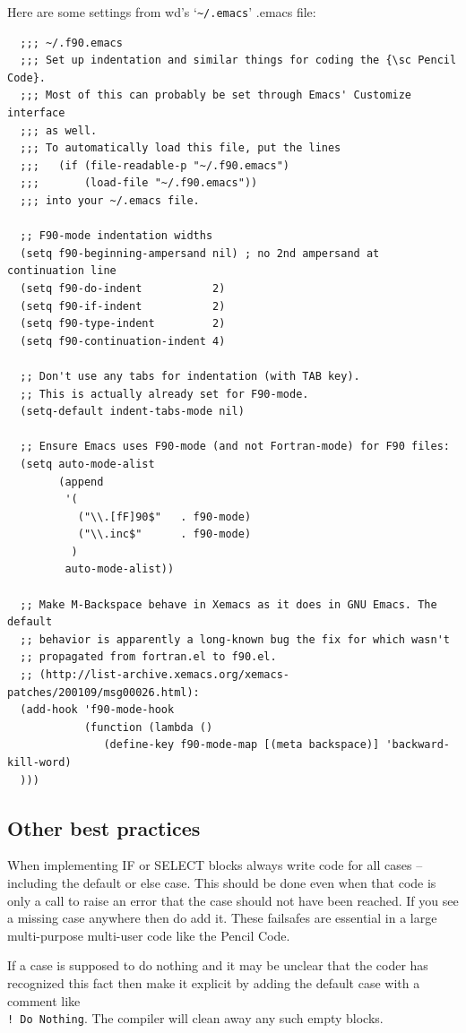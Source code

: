 \documentclass[\mydriver,12pt,twoside,notitlepage,a4paper]{article}
\makeatletter
\newcommand{\code}[1]{\texttt{#1}}
\newcommand{\file}[2][]{%
  \def\index@{#1}%
  `\texttt{#2}'%
  \ifx\index@\@empty\index[file]{#2@\texttt{#2}}%
  \else\index[file]{#1@\texttt{#1}}%
  \fi%
}
\makeatother
\begin{document}
Here are some settings from wd's \file[.emacs]{\~{}/.emacs} file:
\begin{Verbatim}
  ;;; ~/.f90.emacs
  ;;; Set up indentation and similar things for coding the {\sc Pencil Code}.
  ;;; Most of this can probably be set through Emacs' Customize interface
  ;;; as well.
  ;;; To automatically load this file, put the lines
  ;;;   (if (file-readable-p "~/.f90.emacs")
  ;;;       (load-file "~/.f90.emacs"))
  ;;; into your ~/.emacs file.

  ;; F90-mode indentation widths
  (setq f90-beginning-ampersand nil) ; no 2nd ampersand at continuation line
  (setq f90-do-indent           2)
  (setq f90-if-indent           2)
  (setq f90-type-indent         2)
  (setq f90-continuation-indent 4)

  ;; Don't use any tabs for indentation (with TAB key).
  ;; This is actually already set for F90-mode.
  (setq-default indent-tabs-mode nil)

  ;; Ensure Emacs uses F90-mode (and not Fortran-mode) for F90 files:
  (setq auto-mode-alist
        (append
         '(
           ("\\.[fF]90$"   . f90-mode)
           ("\\.inc$"      . f90-mode)
          )
         auto-mode-alist))

  ;; Make M-Backspace behave in Xemacs as it does in GNU Emacs. The default
  ;; behavior is apparently a long-known bug the fix for which wasn't
  ;; propagated from fortran.el to f90.el.
  ;; (http://list-archive.xemacs.org/xemacs-patches/200109/msg00026.html):
  (add-hook 'f90-mode-hook
            (function (lambda ()
               (define-key f90-mode-map [(meta backspace)] 'backward-kill-word)
  )))
\end{Verbatim}

\subsection{Other best practices}
When implementing IF or SELECT blocks always write
code for all cases -- including the default or else case.
This should be done even when that code is only a call to
raise an error that the case should not have been reached.
If you see a missing case anywhere then do add it.  These
failsafes are essential in a large multi-purpose multi-user
code like the {\sc Pencil Code}.

If a case is supposed to do nothing and it may be unclear that the
coder has recognized this fact then make it explicit by adding the
default case with a comment like\\
\code{! Do Nothing}.
The compiler will clean away any such empty blocks.
\end{document}
